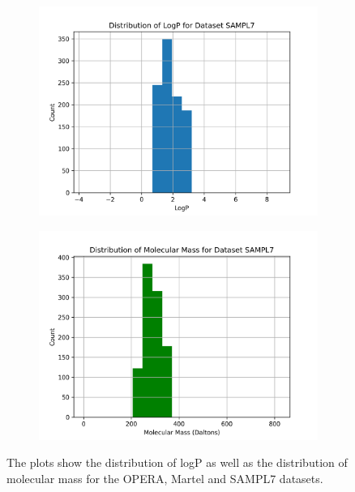 \documentclass{article}
\theoremstyle{definition}
\theoremstyle{remark}
\begin{document}
\begin{figure}
\bigskip %
\begin{subfigure}[t]{0.45\textwidth}
    \includegraphics[width=\linewidth]{./../plots/logp_distribution_SAMPL7.png}
\end{subfigure}\hspace{\fill} %
\begin{subfigure}[t]{0.45\textwidth}
    \includegraphics[width=\linewidth]{./../plots/molecular_mass_distribution_SAMPL7.png}
\end{subfigure}

\caption{The plots show the distribution of logP as well as the distribution of molecular mass for the OPERA, Martel and SAMPL7 datasets.}
\label{figure1}
\end{figure}
\end{document}

